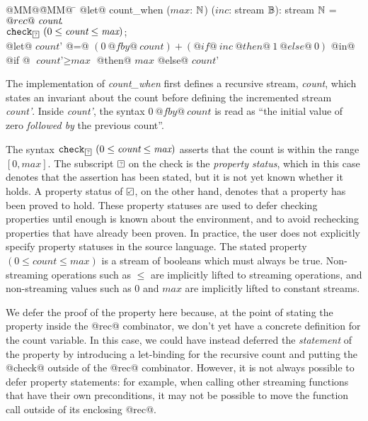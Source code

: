 \begin{tabbing}
  @MM@\= @MM@ \= \kill
  @let@ count_when ($\textit{max}$: $\mathbb{N}$) ($\textit{inc}$: stream $\mathbb{B}$): stream $\mathbb{N}$ = \\
    \> $@rec@~\textit{count}\hspace{-0.1em}.~$ \\
    \> \> $\xcheckP{\PSUnknown}{(0 \le \textit{count} \le \textit{max})}$; \\
    \> \> @let@ $\textit{count'}$ @=@ $(0~@fby@~\textit{count}) + (@if@~\textit{inc}~@then@~1~@else@~0)$ @in@ \\
    \> \> @if @ $\textit{count'} \ge \textit{max}$ @then@ $\textit{max}$  @else@ $\textit{count'}$
\end{tabbing}

The implementation of \emph{count_when} first defines a recursive stream, \emph{count}, which states an invariant about the count before defining the incremented stream \emph{count'}.
Inside \emph{count'}, the syntax $0~@fby@~\textit{count}$ is read as ``the initial value of zero \emph{followed by} the previous count''.

The syntax $\xcheckP{\PSUnknown}{(0 \le \textit{count} \le \textit{max})}$ asserts that the count is within the range $[0, \textit{max}]$.
The subscript $\PSUnknown$ on the check is the \emph{property status}, which in this case denotes that the assertion has been stated, but it is not yet known whether it holds.
A property status of $\PSValid$, on the other hand, denotes that a property has been proved to hold.
These property statuses are used to defer checking properties until enough is known about the environment, and to avoid rechecking properties that have already been proven.
In practice, the user does not explicitly specify property statuses in the source language.
The stated property $(0 \le \textit{count} \le \textit{max})$ is a stream of booleans which must always be true.
Non-streaming operations such as $\le$ are implicitly lifted to streaming operations, and non-streaming values such as $0$ and $\textit{max}$ are implicitly lifted to constant streams.

We defer the proof of the property here because, at the point of stating the property inside the @rec@ combinator, we don't yet have a concrete definition for the count variable.
In this case, we could have instead deferred the \emph{statement} of the property by introducing a let-binding for the recursive count and putting the @check@ outside of the @rec@ combinator.
However, it is not always possible to defer property statements: for example, when calling other streaming functions that have their own preconditions, it may not be possible to move the function call outside of its enclosing @rec@.

